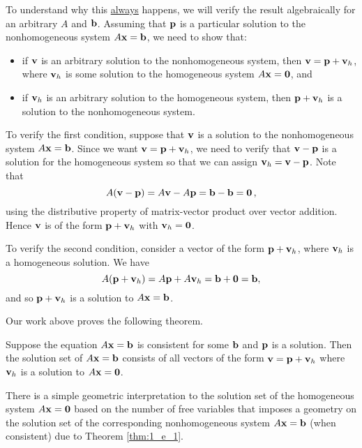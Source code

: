 \vspace{0.2cm}

To understand why this \underline{always} happens, we will verify the result algebraically for an arbitrary $A$ and $\mathbf{b}$. Assuming that $\mathbf{p}$ is a particular solution to the nonhomogeneous system $A\mathbf{x}=\mathbf{b}$, we need to show that:
\begin{itemize}
\item if $\mathbf{v}$ is an arbitrary solution to the nonhomogeneous system, then $\mathbf{v} = \mathbf{p} + \mathbf{v}_h$, where $\mathbf{v}_h$ is some solution to the homogeneous system $A\mathbf{x} = \mathbf{0}$, and
\item if $\mathbf{v}_h$ is an arbitrary solution to the homogeneous system, then $\mathbf{p} + \mathbf{v}_h$ is a solution to the nonhomogeneous system.
\end{itemize}

To verify the first condition, suppose that $\mathbf{v}$ is a solution to the nonhomogeneous system $A \mathbf{x} = \mathbf{b}$. Since we want $\mathbf{v}=\mathbf{p}+\mathbf{v}_h$, we need to verify that $\mathbf{v}-\mathbf{p}$ is a solution for the homogeneous system so that we can assign $\mathbf{v}_h=\mathbf{v}-\mathbf{p}$. Note that
\[A(\mathbf{v} - \mathbf{p}) = A\mathbf{v} - A\mathbf{p} = \mathbf{b} - \mathbf{b} = \mathbf{0} \, ,\]
using the distributive property of matrix-vector product over vector addition. Hence $\mathbf{v}$ is of the form $\mathbf{p} + \mathbf{v}_h$ with $\mathbf{v}_h = \mathbf{0}$.

To verify the second condition, consider a vector of the form $\mathbf{p} + \mathbf{v}_h$, where $\mathbf{v}_h$ is a homogeneous solution. We have
\[A(\mathbf{p} + \mathbf{v}_h) = A\mathbf{p} + A\mathbf{v}_h = \mathbf{b} + \mathbf{0} = \mathbf{b},\]
and so $\mathbf{p} + \mathbf{v}_h$ is a solution to $A \mathbf{x} = \mathbf{b}$.



Our work above proves the following theorem.

\begin{theorem} \label{thm:1_e_1} Suppose the equation $A\mathbf{x}=\mathbf{b}$ is consistent for some $\mathbf{b}$ and $\mathbf{p}$ is a solution. Then the solution set of $A\mathbf{x}=\mathbf{b}$ consists of all vectors of the form $\mathbf{v}=\mathbf{p}+\mathbf{v}_h$ where $\mathbf{v}_h$ is a solution to $A\mathbf{x}=\mathbf{0}$.
\end{theorem}



There is a simple geometric interpretation to the solution set of the homogeneous system $A \mathbf{x} = \mathbf{0}$ based on the number of free variables that imposes a geometry on the solution set of the corresponding nonhomogeneous system $A \mathbf{x} = \mathbf{b}$ (when consistent) due to Theorem \ref{thm:1_e_1}.



